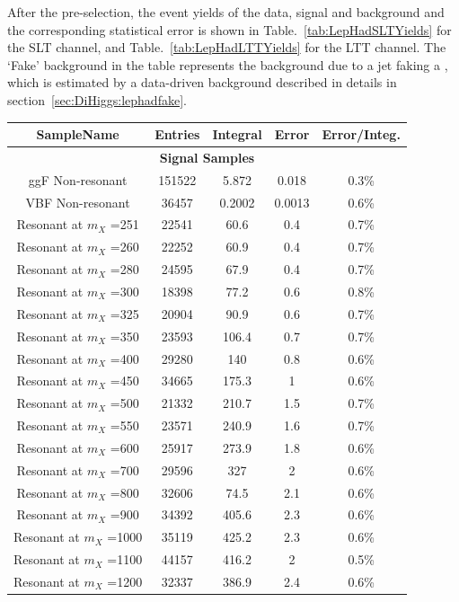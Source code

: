After the pre-selection, the event yields of the data,
signal and background and the corresponding
statistical error is shown in Table.~\ref{tab:LepHadSLTYields} for the 
SLT channel, and Table.~\ref{tab:LepHadLTTYields} for the LTT channel.
The `Fake' background in the table represents the background due to a jet faking
a \tauhad, which is estimated by a
data-driven background described in details in section~\ref{sec:DiHiggs:lephadfake}.
\begin{table}
  \centering
  \scriptsize
  \begin{tabular}{|c|c|c|c|c|}
    \hline
\hline
SampleName & Entries & Integral & Error & Error/Integ.\\
\hline
\multicolumn{5}{|c|}{\textbf{Signal Samples}} \\
\hline
ggF Non-resonant      &151522 &5.872	 & 0.018&0.3\% \\ 
VBF Non-resonant	   	&36457  &  0.2002 &0.0013&0.6\% \\
Resonant at $m_X$ =251	& 22541 &	 60.6 &  0.4& 0.7\% \\
Resonant at $m_X$ =260	& 22252 &	60.9 &  0.4& 0.7\% \\
Resonant at $m_X$ =280	& 24595 &	 67.9 &  0.4& 0.7\% \\
Resonant at $m_X$ =300	& 18398 &	 77.2 &  0.6& 0.8\% \\
Resonant at $m_X$ =325	& 20904 &	90.9 &  0.6& 0.7\% \\
Resonant at $m_X$ =350	& 23593 &	 106.4 &  0.7& 0.7\% \\
Resonant at $m_X$ =400	& 29280 &	 140  &  0.8& 0.6\% \\
Resonant at $m_X$ =450	& 34665 &	 175.3 &  1& 0.6\% \\
Resonant at $m_X$ =500	& 21332 &210.7 &  1.5& 0.7\% \\
Resonant at $m_X$ =550	& 23571 &240.9 &  1.6& 0.7\% \\
Resonant at $m_X$ =600	& 25917 &273.9 &  1.8& 0.6\% \\
Resonant at $m_X$ =700	& 29596 &327   &  2& 0.6\% \\
Resonant at $m_X$ =800	& 32606 &74.5 &  2.1& 0.6\% \\
Resonant at $m_X$ =900	& 34392 &405.6 &  2.3& 0.6\% \\
Resonant at $m_X$ =1000	& 35119 &425.2 &  2.3& 0.6\% \\
Resonant at $m_X$ =1100	& 44157 &416.2 &  2& 0.5\% \\
Resonant at $m_X$ =1200	& 32337 &386.9 &  2.4& 0.6\% \\

\end{tabular}
\end{table}
